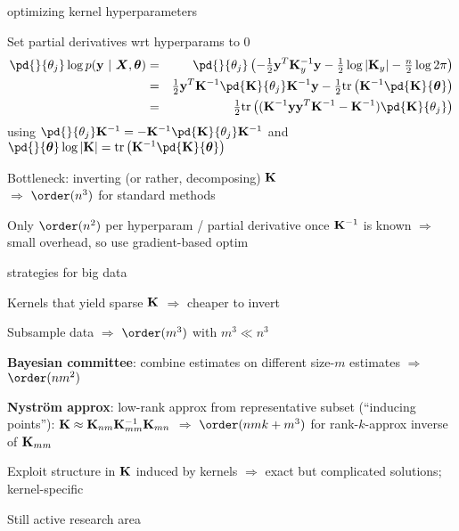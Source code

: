 \documentclass[11pt,compress,t,notes=noshow, xcolor=table]{beamer}
\begin{document}

\begin{framei}[sep=L]{optimizing kernel hyperparameters}
\item Set partial derivatives wrt hyperparams to 0
\begin{eqnarray*}
\pd{}{\theta_j}
\log p(\yv ~|~ \bm{X}, \thetav) &=& \pd{}{\theta_j}  \left(-\tfrac{1}{2}\yv^T\Ky^{-1} \yv - \tfrac{1}{2} \log \left| \Ky \right| - \tfrac{n}{2} \log 2\pi\right) \\ 
&=&\tfrac{1}{2} \yv^T \Kmatinv \pd{\Kmat}{\theta_j}\Kmatinv \yv - \tfrac{1}{2} \text{tr}\left(\Kmatinv \pd{\Kmat}{ \thetav} \right) \\
&=& \tfrac{1}{2} \text{tr}\left((\Kmatinv\yv\yv^T\Kmatinv - \Kmatinv)\pd{\Kmat}{\theta_j}\right)
\end{eqnarray*}
using $\pd{}{\theta_j} \Kmatinv = - \Kmatinv  \pd{\Kmat}{\theta_j}\Kmatinv$ and $\pd{}{\thetav} \log  |\Kmat| = \text{tr}\left(\Kmatinv \pd{\Kmat}{\thetav} \right)$
\item Bottleneck: inverting (or rather, decomposing) $\mathbf{K}$ \\$\Rightarrow$ $\order(n^3)$ for standard methods
\item Only $\order(n^2)$ per hyperparam / partial derivative once $\mathbf{K}^{-1}$ is known $\Rightarrow$ small overhead, so use gradient-based optim 
\end{framei}

\begin{framei}[sep=L]{strategies for big data}
\item Kernels that yield sparse $\mathbf{K}$ $\Rightarrow$ cheaper to invert
\item Subsample data $\Rightarrow$ $\order(m^3)$ with $m^3 \ll n^3$
\item \textbf{Bayesian committee}: combine estimates on different size-$m$ estimates $\Rightarrow$ $\order(nm^2)$
\item \textbf{Nyström approx}: low-rank approx from representative subset (``inducing points''): $\mathbf{K} \approx \mathbf{K}_{nm}\mathbf{K}_{mm}^{-1}\mathbf{K}_{mn}$ $\Rightarrow$ $\order(nmk + m^3)$ for rank-$k$-approx inverse of $\mathbf{K}_{mm}$
\item Exploit structure in $\mathbf{K}$ induced by kernels $\Rightarrow$ exact but complicated solutions; kernel-specific
\item Still active research area
\end{framei}

% 
% 
% 
% 
% 
% 

\endlecture
\end{document}
